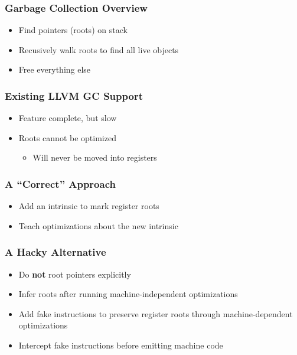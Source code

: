 \documentclass[ignorenonframetext,12pt]{beamer}
\begin{document}
\begin{frame}\frametitle{Garbage Collection Overview}
\large
\begin{itemize}
  \item<alert@2> Find pointers (roots) on stack
  \item<alert@3> Recusively walk roots to find all live objects
  \item<alert@4> Free everything else
\end{itemize}
\end{frame}

\begin{frame}\frametitle{Existing LLVM GC Support}
\large
\begin{itemize}
  \item Feature complete, but slow
  \item Roots cannot be optimized
  \begin{itemize}
    \item Will never be moved into registers
  \end{itemize}
\end{itemize}
\end{frame}

\begin{frame}\frametitle{A ``Correct'' Approach}
\large
\begin{itemize}
  \item Add an intrinsic to mark register roots
  \item Teach optimizations about the new intrinsic
\end{itemize}
\end{frame}

\begin{frame}\frametitle{A Hacky Alternative}
\large
\begin{itemize}
  \item Do \textbf{not} root pointers explicitly
  \item Infer roots after running machine-independent optimizations
  \item Add fake instructions to preserve register roots through machine-dependent optimizations
  \item Intercept fake instructions before emitting machine code
\end{itemize}
\end{frame}
\end{document}
